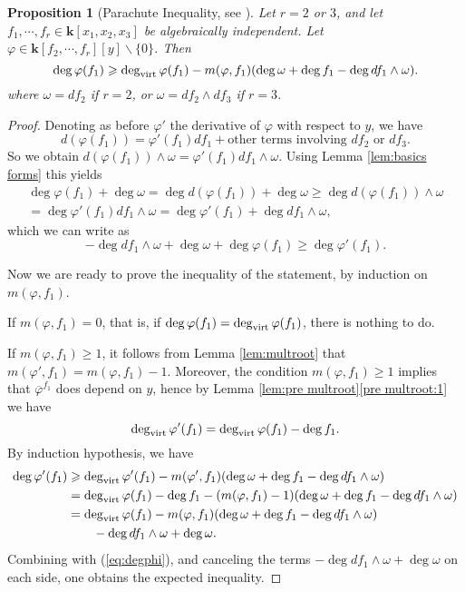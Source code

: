 \documentclass[reqno,oneside,11pt]{amsart}
\theoremstyle{plain}
\newtheorem{proposition}[theorem]{Proposition}
\theoremstyle{definition}
\newcommand{\K}{\mathbf{k}}
\renewcommand{\phi}{\varphi}
\newcommand{\dvirt}{\deg_{\text{\rm virt}}}
\newcommand{\topcomp}[2]{\overline{#1}^{#2}}
\renewcommand{\ge}{\geqslant}
\begin{document}
\begin{proposition}[Parachute Inequality, see {\cite[Theorem 2.1]{Ku:ineq}}] \label{pro:parachute}
Let $r = 2$ or $3$, and let $f_1,\cdots,f_r \in \K[x_1,x_2,x_3]$ be algebraically independent.
Let $\phi \in \K[f_2,\cdots, f_r][y] \smallsetminus \{0\}$.
Then
$$\deg \phi(f_1) \ge \dvirt \phi(f_1) - m(\phi,f_1) (\deg \omega + \deg f_1 - \deg df_1 \wedge \omega).$$
where $\omega =  df_2$ if $r= 2$, or $\omega = df_2 \wedge df_3$ if $r = 3$.
\end{proposition}

\begin{proof}
Denoting as before $\phi'$ the derivative of $\phi$ with respect to $y$, we have
$$d (\phi(f_1)) = \phi'(f_1) df_1 + \text{other terms involving }df_2 \text{ or } df_3.$$
So we obtain $  d( \phi(f_1)) \wedge \omega = \phi'(f_1)  df_1 \wedge \omega $.
Using Lemma \ref{lem:basics forms} this yields
\begin{multline*}
\deg \phi(f_1) + \deg \omega = \deg d( \phi(f_1)) + \deg \omega  \ge \deg   d( \phi(f_1)) \wedge \omega\\
= \deg  \phi'(f_1)   df_1 \wedge \omega = \deg \phi'(f_1) + \deg   df_1 \wedge \omega,
\end{multline*}
which we can write as
\begin{equation}
\label{eq:degphi}
- \deg     df_1 \wedge \omega + \deg \omega + \deg \phi(f_1) \ge \deg \phi'(f_1).
\end{equation}

Now we are ready to prove the inequality of the statement, by induction on $m(\phi,f_1)$.

If $m(\phi,f_1) = 0$, that is, if $\deg \phi(f_1) = \dvirt \phi(f_1)$, there is nothing to do.

If $m(\phi,f_1) \ge 1$, it follows from Lemma \ref{lem:multroot} that
$m(\phi',f_1) = m(\phi,f_1) - 1$.
Moreover, the condition $m(\phi,f_1) \ge 1$ implies that $\topcomp{\phi}{f_1}$
does depend on $y$, hence by Lemma \ref{lem:pre multroot}\ref{pre multroot:1}
we have
$$\dvirt \phi'(f_1) = \dvirt \phi(f_1) - \deg f_1.$$
By induction hypothesis, we have
\begin{align*}
\deg \phi'(f_1) &\ge \dvirt \phi'(f_1) - m(\phi',f_1) (\deg \omega + \deg f_1 - \deg df_1 \wedge \omega) \\
&= \dvirt \phi(f_1) - \deg f_1 - (m(\phi,f_1) - 1) (\deg \omega + \deg f_1
-\deg df_1 \wedge \omega ) \\
&= \dvirt \phi(f_1) - m(\phi,f_1)(\deg \omega + \deg f_1 -\deg df_1 \wedge \omega ) \\
& \qquad-\deg df_1 \wedge \omega + \deg \omega.
\end{align*}
Combining with (\ref{eq:degphi}), and canceling the terms $- \deg   df_1 \wedge \omega + \deg \omega$ on each side, one obtains the expected inequality.
\end{proof}
\end{document}
